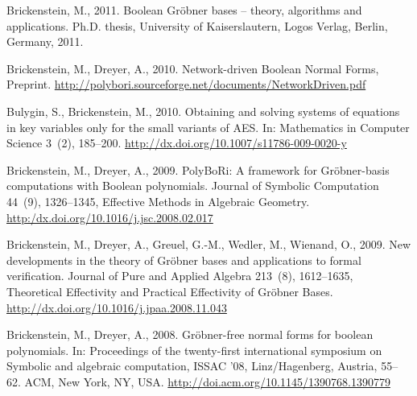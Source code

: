 \begin{thebibliography}{31}

Brickenstein, M., 2011. Boolean {Gr{\"{o}}}bner bases -- theory, algorithms and
  applications. Ph.D. thesis, University of Kaiserslautern, Logos Verlag, Berlin,
  Germany, 2011.

Brickenstein, M., Dreyer, A., 2010. Network-driven Boolean Normal Forms,
Preprint. 
\newline\url{http://polybori.sourceforge.net/documents/NetworkDriven.pdf}

Bulygin, S., Brickenstein, M., 2010. Obtaining and solving systems of equations
  in key variables only for the small variants of {AES}. In: Mathematics in
  Computer Science 3~(2), 185--200.
\newline\url{http://dx.doi.org/10.1007/s11786-009-0020-y}

Brickenstein, M., Dreyer, A., 2009. {PolyBoRi}: A framework for
  {Gröbner}-basis computations with {Boolean} polynomials. Journal of Symbolic
  Computation 44~(9), 1326--1345, {Effective Methods in Algebraic Geometry}.
\newline\url{http:/dx.doi.org/10.1016/j.jsc.2008.02.017}

Brickenstein, M., Dreyer, A., Greuel, G.-M., Wedler, M., Wienand, O.,
  2009. New developments in the theory of {Gröbner} bases and applications to
  formal verification. Journal of Pure and Applied Algebra 213~(8), 1612--1635,
  {Theoretical Effectivity and Practical Effectivity of Gröbner Bases}.
\newline\url{http://dx.doi.org/10.1016/j.jpaa.2008.11.043}

Brickenstein, M., Dreyer, A., 2008.
  Gr\"{o}bner-free normal forms for boolean polynomials.
 In: Proceedings of the twenty-first international symposium on Symbolic and algebraic computation,
 ISSAC '08, Linz/Hagenberg, Austria, 55--62. ACM, New York, NY, USA.
\newline\url{http://doi.acm.org/10.1145/1390768.1390779}

\end{thebibliography}
